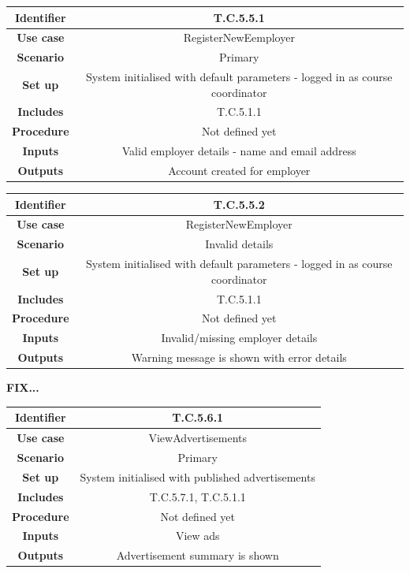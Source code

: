 \documentclass{l3deliverable}
\begin{document}
\begin{tabular}{|c|c|}
\hline \textbf{Identifier} & T.C.5.5.1\\
\hline \textbf{Use case} & RegisterNewEemployer\\
\hline \textbf{Scenario} & Primary\\
\hline \textbf{Set up} & System initialised with default parameters - logged in as course coordinator\\
\hline \textbf{Includes} & T.C.5.1.1\\
\hline \textbf{Procedure} & Not defined yet\\
\hline \textbf{Inputs} & Valid employer details - name and email address\\
\hline \textbf{Outputs} & Account created for employer\\
\hline
\end{tabular}

\begin{tabular}{|c|c|}
\hline \textbf{Identifier} & T.C.5.5.2\\
\hline \textbf{Use case} & RegisterNewEmployer\\
\hline \textbf{Scenario} & Invalid details\\
\hline \textbf{Set up} & System initialised with default parameters - logged in as course coordinator\\
\hline \textbf{Includes} & T.C.5.1.1\\
\hline \textbf{Procedure} & Not defined yet\\
\hline \textbf{Inputs} & Invalid/missing employer details\\
\hline \textbf{Outputs} & Warning message is shown with error details\\
\hline
\end{tabular}

\textbf{FIX...}
\begin{tabular}{|c|c|}
\hline \textbf{Identifier} & T.C.5.6.1\\
\hline \textbf{Use case} & ViewAdvertisements\\
\hline \textbf{Scenario} & Primary\\
\hline \textbf{Set up} & System initialised with published advertisements\\
\hline \textbf{Includes} & T.C.5.7.1, T.C.5.1.1\\
\hline \textbf{Procedure} & Not defined yet\\
\hline \textbf{Inputs} & View ads\\
\hline \textbf{Outputs} & Advertisement summary is shown\\
\hline
\end{tabular}
\end{document}
